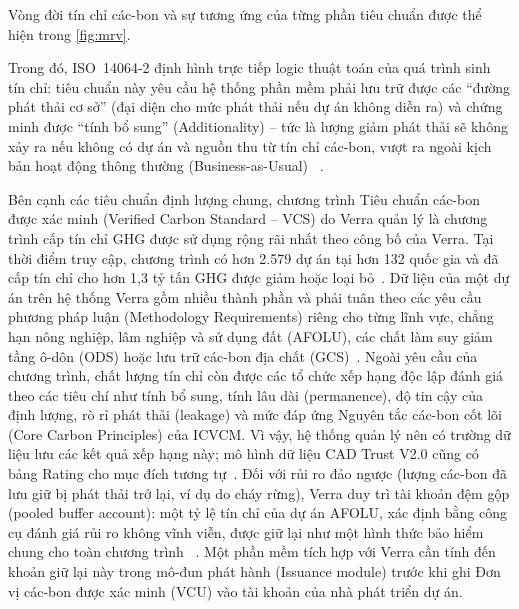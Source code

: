 \HinhMRV

Vòng đời tín chỉ các-bon và sự tương ứng của từng phần tiêu chuẩn được thể hiện trong \autoref{fig:mrv}.

Trong đó, ISO~14064-2 định hình trực tiếp logic thuật toán của quá trình sinh tín chỉ: tiêu chuẩn này yêu cầu hệ thống phần mềm phải lưu trữ được các ``đường phát thải cơ sở'' (đại diện cho mức phát thải nếu dự án không diễn ra) và chứng minh được ``tính bổ sung'' (Additionality) -- tức là lượng giảm phát thải sẽ không xảy ra nếu không có dự án và nguồn thu từ tín chỉ các-bon, vượt ra ngoài kịch bản hoạt động thông thường (Business-as-Usual)~\cite{columbia2025article6} \cite{iso14064-2}.

Bên cạnh các tiêu chuẩn định lượng chung, chương trình Tiêu chuẩn các-bon được xác minh (Verified Carbon Standard -- VCS) do Verra quản lý là chương trình cấp tín chỉ GHG được sử dụng rộng rãi nhất theo công bố của Verra. Tại thời điểm truy cập, chương trình có hơn 2.579 dự án tại hơn 132 quốc gia và đã cấp tín chỉ cho hơn 1,3 tỷ tấn GHG được giảm hoặc loại bỏ~\cite{verra2024vcs}. Dữ liệu của một dự án trên hệ thống Verra gồm nhiều thành phần và phải tuân theo các yêu cầu phương pháp luận (Methodology Requirements) riêng cho từng lĩnh vực, chẳng hạn nông nghiệp, lâm nghiệp và sử dụng đất (AFOLU), các chất làm suy giảm tầng ô-dôn (ODS) hoặc lưu trữ các-bon địa chất (GCS)~\cite{verra2024vcs}. Ngoài yêu cầu của chương trình, chất lượng tín chỉ còn được các tổ chức xếp hạng độc lập đánh giá theo các tiêu chí như tính bổ sung, tính lâu dài (permanence), độ tin cậy của định lượng, rò rỉ phát thải (leakage) và mức đáp ứng Nguyên tắc các-bon cốt lõi (Core Carbon Principles) của ICVCM. Vì vậy, hệ thống quản lý nên có trường dữ liệu lưu các kết quả xếp hạng này; mô hình dữ liệu CAD Trust V2.0 cũng có bảng Rating cho mục đích tương tự~\cite{cadtrust2025datamodel}. Đối với rủi ro đảo ngược (lượng các-bon đã lưu giữ bị phát thải trở lại, ví dụ do cháy rừng), Verra duy trì tài khoản đệm gộp (pooled buffer account): một tỷ lệ tín chỉ của dự án AFOLU, xác định bằng công cụ đánh giá rủi ro không vĩnh viễn, được giữ lại như một hình thức bảo hiểm chung cho toàn chương trình~\cite{verra2024vcs} \cite{verra2024projecthub}. Một phần mềm tích hợp với Verra cần tính đến khoản giữ lại này trong mô-đun phát hành (Issuance module) trước khi ghi Đơn vị các-bon được xác minh (VCU) vào tài khoản của nhà phát triển dự án.

